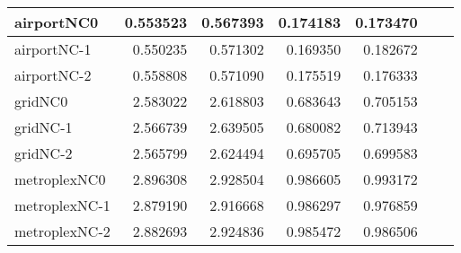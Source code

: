 \begin{longtable}{|l|r|r|r|r|r|r|}
airportNC0 & 0.553523 & 0.567393 & 0.174183 & 0.173470 \\ \hline
airportNC-1 & 0.550235 & 0.571302 & 0.169350 & 0.182672 \\ \hline
airportNC-2 & 0.558808 & 0.571090 & 0.175519 & 0.176333 \\ \hline
gridNC0 & 2.583022 & 2.618803 & 0.683643 & 0.705153 \\ \hline
gridNC-1 & 2.566739 & 2.639505 & 0.680082 & 0.713943 \\ \hline
gridNC-2 & 2.565799 & 2.624494 & 0.695705 & 0.699583 \\ \hline
metroplexNC0 & 2.896308 & 2.928504 & 0.986605 & 0.993172 \\ \hline
metroplexNC-1 & 2.879190 & 2.916668 & 0.986297 & 0.976859 \\ \hline
metroplexNC-2 & 2.882693 & 2.924836 & 0.985472 & 0.986506 \\ \hline
\end{longtable}
